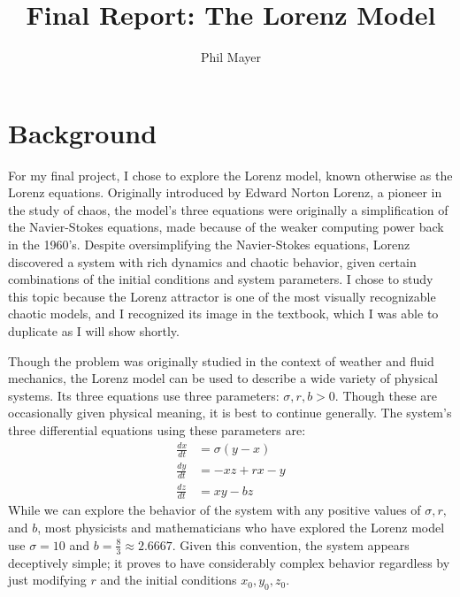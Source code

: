 \documentclass[12pt]{amsart}
\title{Final Report: The Lorenz Model}
\author{Phil Mayer}
\begin{document}
\maketitle

\section{Background}
For my final project, I chose to explore the Lorenz model, known otherwise as the Lorenz equations. Originally introduced by Edward Norton 
Lorenz, a pioneer in the study of chaos, the model's three equations were originally a simplification of the Navier-Stokes equations, made
because of the weaker computing power back in the 1960's. Despite oversimplifying the Navier-Stokes equations, Lorenz discovered a system 
with rich dynamics and chaotic behavior, given certain combinations of the initial conditions and system parameters. I chose to study this topic
because the Lorenz attractor is one of the most visually recognizable chaotic models, and I recognized its image in the textbook, which I was
able to duplicate as I will show shortly.

Though the problem was originally studied in the context of weather and fluid mechanics, the Lorenz model can be used to describe a wide
variety of physical systems. Its three equations use three parameters: $\sigma, r, b > 0$. Though these are occasionally given physical meaning,
it is best to continue generally. The system's three differential equations using these parameters are:
\begin{align*}
	\frac{dx}{dt} &= \sigma(y - x) \\
	\frac{dy}{dt} &= -xz + rx - y \\
	\frac{dz}{dt} &= xy - bz
\end{align*}
While we can explore the behavior of the system with any positive values of $\sigma, r,$ and $b$, most physicists and mathematicians who
have explored the Lorenz model use $\sigma = 10$ and $b = \frac{8}{3} \approx 2.6667$. Given this convention, the system appears
deceptively simple; it proves to have considerably complex behavior regardless by just modifying $r$ and the initial conditions $x_0, y_0, z_0$.

\newpage
\end{document}
